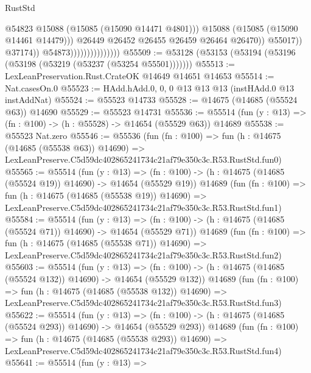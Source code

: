 \begin{lexlean}{RustStd}
\begin{coremodule}
                                                  @54823
                                                  @15088
                                                  (@15085 (@15090 @14471 @4801)))
                                                @15088
                                                (@15085 (@15090 @14461 @14479)))
                                              @26449
                                              @26452
                                              @26455
                                              @26459
                                              @26464
                                              @26470))
                                          @55017))
                                      @37174))
                                  @54873)))))))))))))))
@55509 := @53128 (@53153 (@53194 (@53196 (@53198 (@53219 (@53237 (@53254 @55501)))))))
@55513 := LexLeanPreservation.Rust.CrateOK @14649 @14651 @14653
@55514 := Nat.casesOn.{0}
@55523 := HAdd.hAdd.{0, 0, 0} @13 @13 @13 (instHAdd.{0} @13 instAddNat)
@55524 := @55523 @14733
@55528 := @14675 (@14685 (@55524 @63)) @14690
@55529 := @55523 @14731
@55536 := @55514 (fun (y : @13) => (fn : @100) -> (h : @55528) -> @14654 (@55529 @63)) @14689
@55538 := @55523 Nat.zero
@55546 := @55536
    (fun (fn : @100) =>
    fun (h : @14675 (@14685 (@55538 @63)) @14690) =>
    LexLeanPreserve.C5d59dc402865241734c21af79e350c3c.R53.RustStd.fun0)
@55565 := @55514
    (fun (y : @13) =>
    (fn : @100) -> (h : @14675 (@14685 (@55524 @19)) @14690) -> @14654 (@55529 @19))
    @14689
    (fun (fn : @100) =>
    fun (h : @14675 (@14685 (@55538 @19)) @14690) =>
    LexLeanPreserve.C5d59dc402865241734c21af79e350c3c.R53.RustStd.fun1)
@55584 := @55514
    (fun (y : @13) =>
    (fn : @100) -> (h : @14675 (@14685 (@55524 @71)) @14690) -> @14654 (@55529 @71))
    @14689
    (fun (fn : @100) =>
    fun (h : @14675 (@14685 (@55538 @71)) @14690) =>
    LexLeanPreserve.C5d59dc402865241734c21af79e350c3c.R53.RustStd.fun2)
@55603 := @55514
    (fun (y : @13) =>
    (fn : @100) -> (h : @14675 (@14685 (@55524 @132)) @14690) -> @14654 (@55529 @132))
    @14689
    (fun (fn : @100) =>
    fun (h : @14675 (@14685 (@55538 @132)) @14690) =>
    LexLeanPreserve.C5d59dc402865241734c21af79e350c3c.R53.RustStd.fun3)
@55622 := @55514
    (fun (y : @13) =>
    (fn : @100) -> (h : @14675 (@14685 (@55524 @293)) @14690) -> @14654 (@55529 @293))
    @14689
    (fun (fn : @100) =>
    fun (h : @14675 (@14685 (@55538 @293)) @14690) =>
    LexLeanPreserve.C5d59dc402865241734c21af79e350c3c.R53.RustStd.fun4)
@55641 := @55514
    (fun (y : @13) =>

\end{coremodule}
\end{lexlean}
